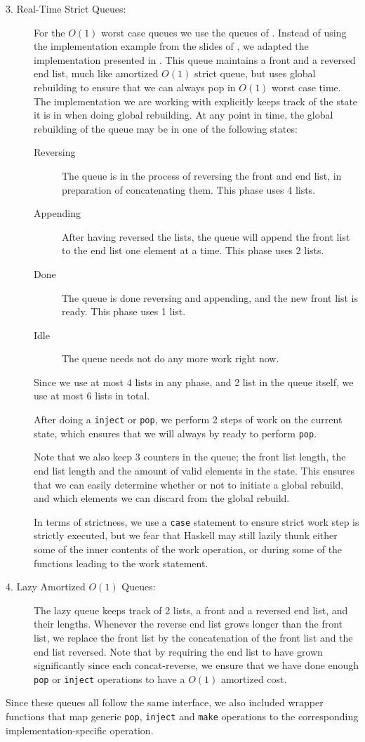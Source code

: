 \begin{description}
\item[3. Real-Time Strict Queues:] 
For the $O(1)$ worst case queues we use the queues of \citep{melville}. Instead of using the implementation example from the slides of \citep{gerth}, we adapted the implementation presented in \citep{okasaki}. This queue maintains a front and a reversed end list, much like amortized $O(1)$ strict queue, but uses global rebuilding to ensure that we can always pop in $O(1)$ worst case time. The implementation we are working with explicitly keeps track of the state it is in when doing global rebuilding. At any point in time, the global rebuilding of the queue may be in one of the following states:
\begin{description}
\item[Reversing] The queue is in the process of reversing the front and end list, in preparation of concatenating them. This phase uses 4 lists.
\item[Appending] After having reversed the lists, the queue will append the front list to the end list one element at a time. This phase uses 2 lists.
\item[Done] The queue is done reversing and appending, and the new front list is ready. This phase uses 1 list.
\item[Idle] The queue needs not do any more work right now.
\end{description}

Since we use at most 4 lists in any phase, and 2 list in the queue itself, we use at most 6 lists in total.

After doing a \texttt{inject} or \texttt{pop}, we perform 2 steps of work on the current state, which ensures that we will always by ready to perform \texttt{pop}.

Note that we also keep 3 counters in the queue; the front list length, the end list length and the amount of valid elements in the state. This ensures that we can easily determine whether or not to initiate a global rebuild, and which elements we can discard from the global rebuild.

In terms of strictness, we use a \texttt{case} statement to ensure strict work step is strictly executed, but we fear that Haskell may still lazily thunk either some of the inner contents of the work operation, or during some of the functions leading to the work statement.

\item[4. Lazy Amortized $O(1)$ Queues:]

The lazy queue keeps track of 2 lists, a front and a reversed end list, and their lengths. Whenever the reverse end list grows longer than the front list, we replace the front list by the concatenation of the front list and the end list reversed. 
Note that by requiring the end list to have grown significantly since each concat-reverse, we ensure that we have done enough \texttt{pop} or \texttt{inject} operations to have a $O(1)$ amortized cost.

\end{description}

Since these queues all follow the same interface, we also included wrapper functions that map generic \texttt{pop}, \texttt{inject} and \texttt{make} operations to the corresponding implementation-specific operation.